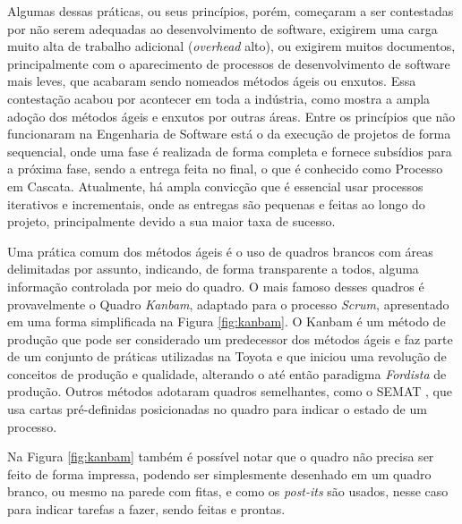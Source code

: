\documentclass{article}
\begin{document}
Algumas dessas práticas, ou seus princípios, porém, começaram a ser contestadas por não serem adequadas ao desenvolvimento de software, exigirem uma carga muito alta de trabalho adicional (\textit{overhead} alto), ou exigirem muitos documentos, principalmente com o aparecimento de processos de desenvolvimento de software mais leves, que acabaram sendo nomeados métodos ágeis ou enxutos. Essa contestação acabou por acontecer em toda a indústria, como mostra a ampla adoção dos métodos ágeis e enxutos por outras áreas. Entre os princípios que não funcionaram na Engenharia de Software está o da execução de projetos de forma sequencial, onde uma fase é realizada de forma completa e fornece subsídios para a próxima fase, sendo a entrega feita no final, o que é conhecido como Processo em Cascata. Atualmente, há ampla convicção que é essencial usar processos iterativos e incrementais, onde as entregas são pequenas e feitas ao longo do projeto, principalmente devido a sua maior taxa de sucesso\citep{pressman:2019,chaos:2015}.

Uma prática comum dos métodos ágeis é o uso de quadros brancos com áreas delimitadas por assunto, indicando, de forma transparente a todos, alguma informação controlada  por meio do quadro. O mais famoso desses quadros é provavelmente o Quadro \textit{Kanbam}, adaptado para o processo \textit{Scrum}\citep{scrum:sbok:guide}, apresentado em uma forma simplificada na Figura \ref{fig:kanbam}. O Kanbam é um método de produção que pode ser considerado um predecessor dos métodos ágeis e faz  parte de um conjunto de práticas utilizadas na Toyota e que iniciou uma revolução de conceitos de produção e qualidade, alterando o até então paradigma \textit{Fordista} de produção. Outros métodos adotaram quadros semelhantes, como o SEMAT \citep{jacobson_essentials_2019}, que usa cartas pré-definidas posicionadas no quadro para indicar o estado de um processo.

Na Figura \ref{fig:kanbam} também é possível notar que o quadro não precisa ser feito de forma impressa, podendo ser simplesmente desenhado em um quadro branco, ou mesmo na parede com fitas, e como os \textit{post-its} são usados, nesse caso para indicar tarefas a fazer, sendo feitas e prontas.
\end{document}
